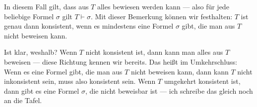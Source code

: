 \begin{math-stroke}
\end{math-stroke}

\begin{spoken-clean}[00:26:35 - 00:28:32]
In diesem Fall gilt, dass aus $T$ alles bewiesen werden kann --- also für jede beliebige Formel $\sigma$ gilt $T \vdash \sigma$. Mit dieser Bemerkung können wir festhalten: $T$ ist genau dann konsistent, wenn es mindestens eine Formel $\sigma$ gibt, die man aus $T$ nicht beweisen kann.

Ist klar, weshalb? Wenn $T$ nicht konsistent ist, dann kann man alles aus $T$ beweisen --- diese Richtung kennen wir bereits. Das heißt im Umkehrschluss: Wenn es eine Formel gibt, die man aus $T$ nicht beweisen kann, dann kann $T$ nicht inkonsistent sein, muss also konsistent sein. Wenn $T$ umgekehrt konsistent ist, dann gibt es eine Formel $\sigma$, die nicht beweisbar ist --- ich schreibe das gleich noch an die Tafel.
\end{spoken-clean}

